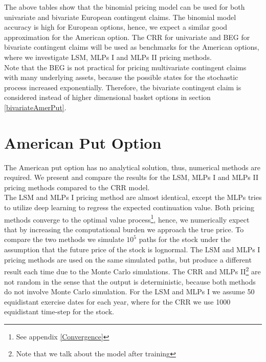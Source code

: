 The above tables show that the binomial pricing model can be used for both univariate and bivariate European contingent claims. The binomial model accuracy is high for European options, hence, we expect a similar good approximation for the American option. The CRR for univariate and BEG for bivariate contingent claims will be used as benchmarks for the American options, where we investigate LSM, MLPs I and MLPs II pricing methods. \\

Note that the BEG is not practical for pricing multivariate contingent claims with many underlying assets, because the possible states for the stochastic process increased exponentially. Therefore, the bivariate contingent claim is considered instead of higher dimensional basket options in section \ref{bivariateAmerPut}.
\section{American Put Option}
The American put option has no analytical solution, thus, numerical methods are required. We present and compare the results for the LSM, MLPs I and MLPs II pricing methods compared to the CRR model.\\

The LSM and MLPs I pricing method are almost identical, except the MLPs tries to utilize deep learning to regress the expected continuation value. Both pricing methods converge to the optimal value process\footnote{See appendix \ref{Convergence}}, hence, we numerically expect that by increasing the computational burden we approach the true price. To compare the two methods we simulate $10^5$ paths for the stock under the assumption that the future price of the stock is lognormal. The LSM and MLPs I pricing methods are used on the same simulated paths, but produce a different result each time due to the Monte Carlo simulations. The CRR and MLPs II\footnote{Note that we talk about the model after training} are not random in the sense that the output is deterministic, because both methods do not involve Monte Carlo simulation. For the LSM and MLPs I we assume 50 equidistant exercise dates for each year, where for the CRR we use 1000 equidistant time-step for the stock.  \\

